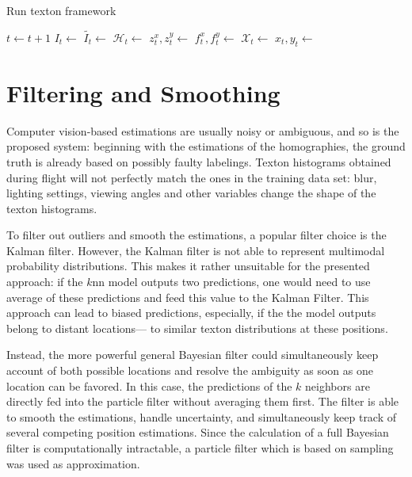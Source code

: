 \begin{algorithm}
\caption{{Run texton framework}}
\label{alg:trexton_run}
  \begin{algorithmic}[1]
    \State $t \gets t+1$ 
    \State $I_t \gets$ 
    \State $\widetilde{I_t} \gets$ 
    \State $\mathcal{H}_t \gets$ 
    \State $z_t^x, z_t^y \gets$ 
    \State $f_t^x, f_t^y \gets$ 
    \State $\mathcal{X}_t \gets$
    \State $x_t, y_t \gets$ 
    \State {}
    \EndProcedure
  \end{algorithmic}
\end{algorithm}


\section{Filtering and Smoothing}
\label{sec:filtering}


Computer vision-based estimations are usually noisy or ambiguous, and
so is the proposed system: beginning with the estimations of the
homographies, the ground truth is already based on possibly faulty
labelings. Texton histograms obtained during flight will not perfectly
match the ones in the training data set: blur, lighting settings,
viewing angles and other variables change the shape of the texton
histograms.

To filter out outliers and smooth the estimations, a popular filter
choice is the Kalman filter. However, the Kalman filter is not able to
represent multimodal probability distributions. This makes it rather
unsuitable for the presented approach: if the $k$nn model outputs two
predictions, one would need to use average of these predictions and
feed this value to the Kalman Filter. This approach can lead to biased
predictions, especially, if the the model outputs belong to distant
locations--- to similar texton distributions at these positions.

Instead, the more powerful general Bayesian filter could simultaneously keep
account of both possible locations and resolve the ambiguity as soon
as one location can be favored. In this case, the predictions of the
$k$ neighbors are directly fed into the particle filter without
averaging them first. The filter is able to smooth the estimations,
handle uncertainty, and simultaneously keep track of several competing
position estimations. Since the calculation of a full Bayesian filter is computationally intractable, a particle filter which is based on sampling was used as approximation. 

